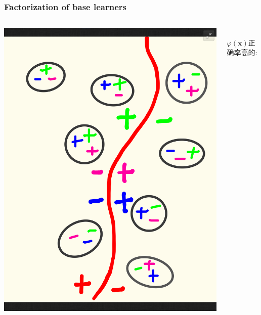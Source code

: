 \documentclass{beamer}
\begin{document}
\begin{frame}
\frametitle{Factorization of base learners}
\begin{columns}[T]
  \begin{column}{.55\textwidth}
    \includegraphics[width=\textwidth]{img/gbc_3.png}
  \end{column}
  \begin{column}{.45\textwidth}
    \ \\
    $\varphi(\mathbf{x})$正确率高的: \\

\end{column}
\end{columns}
\end{frame}
\end{document}
